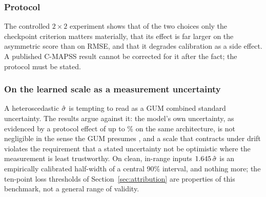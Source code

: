 \documentclass[journal]{IEEEtran}
\begin{document}
\subsubsection*{Protocol}
The controlled $2\times2$ experiment shows that of the two choices only the checkpoint criterion matters materially, that its effect is far larger on the asymmetric score than on RMSE, and that it degrades calibration as a side effect. A published C-MAPSS result cannot be corrected for it after the fact; the protocol must be stated.
\subsubsection*{On the learned scale as a measurement uncertainty}
A heteroscedastic $\hat{\sigma}$ is tempting to read as a GUM combined standard uncertainty. The results argue against it: the model's own uncertainty, as evidenced by a protocol effect of up to \NLeakRMSEmax\% on the same architecture, is not negligible in the sense the GUM presumes \cite{angrisani2026}, and a scale that contracts under drift violates the requirement that a stated uncertainty not be optimistic where the measurement is least trustworthy. On clean, in-range inputs $1.645\,\hat{\sigma}$ is an empirically calibrated half-width of a central 90\% interval, and nothing more; the ten-point loss thresholds of Section~\ref{sec:attribution} are properties of this benchmark, not a general range of validity.
\end{document}
